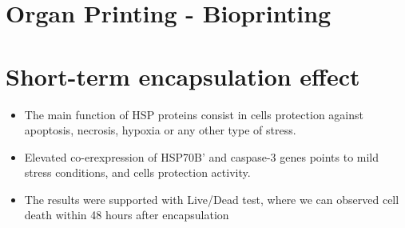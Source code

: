 \section{Organ Printing - Bioprinting}

\section{Short-term encapsulation effect}

\begin{multicols}{2}
    \begin{itemize}
        \item The main function of HSP proteins consist in cells protection against apoptosis, necrosis, hypoxia or any other type of stress.
        \item Elevated co-erexpression of HSP70B' and caspase-3 genes points to mild stress conditions, and cells protection activity.
        \item The results were supported with Live/Dead test, where we can observed cell death within 48 hours after encapsulation
    \end{itemize}
\end{multicols}


